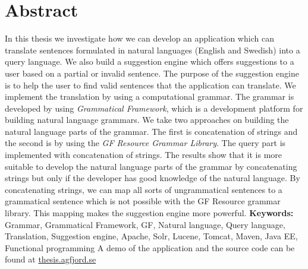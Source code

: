 \begingroup
\let\clearpage\relax
\let\cleardoublepage\relax
\let\cleardoublepage\relax

\chapter*{Abstract}
In this thesis we investigate how we can develop an application which can translate sentences formulated in natural languages (English and Swedish) into a query language. We also build a suggestion engine which offers suggestions to a user based on a partial or invalid sentence. The purpose of the suggestion engine is to help the user to find valid sentences that the application can translate.
\newline
\newline
We implement the translation by using a computational grammar. The grammar is developed by using \emph{Grammatical Framework}, which is a development platform for building natural language grammars. We take two approaches on building the natural language parts of the grammar. The first is concatenation of strings and the second is by using the \emph{GF Resource Grammar Library}. The query part is implemented with concatenation of strings.
\newline
\newline
The results show that it is more suitable to develop the natural language parts of the grammar by concatenating strings but only if the developer has good knowledge of the natural language. By concatenating strings, we can map all sorts of ungrammatical sentences to a grammatical sentence which is not possible with the GF Resource grammar library. This mapping makes the suggestion engine more powerful.
\newline
\newline
\textbf{Keywords:} Grammar, Grammatical Framework, GF, Natural language, Query language, Translation, Suggestion engine, Apache, Solr, Lucene, Tomcat, Maven, Java EE, Functional programming
\newline
\newline
A demo of the application and the source code can be found at \href{http://thesis.agfjord.se/}{thesis.agfjord.se}

\endgroup			

\vfill